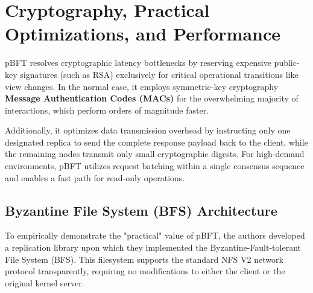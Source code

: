 \section{Cryptography, Practical Optimizations, and Performance}
pBFT resolves cryptographic latency bottlenecks by reserving expensive public-key signatures (such as RSA) exclusively for critical operational transitions like view changes. In the normal case, it employs symmetric-key cryptography \textbf{Message Authentication Codes (MACs)} for the overwhelming majority of interactions, which perform orders of magnitude faster.

Additionally, it optimizes data transmission overhead by instructing only one designated replica to send the complete response payload back to the client, while the remaining nodes transmit only small cryptographic digests. For high-demand environments, pBFT utilizes request batching within a single consensus sequence and enables a fast path for read-only operations.

\subsection{Byzantine File System (BFS) Architecture}
To empirically demonstrate the "practical" value of pBFT, the authors developed a replication library upon which they implemented the Byzantine-Fault-tolerant File System (BFS). This filesystem supports the standard NFS V2 network protocol transparently, requiring no modifications to either the client or the original kernel server.


